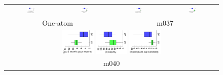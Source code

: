 \documentclass[usletter, 10pt, conference]{ieeeconf} %
\def\LA{L_1}
\def\LB{L_2}
\begin{document}
{\def\a{270}
\begin{figure}
\centering
\renewcommand{\tabcolsep}{0pt}
\begin{tabular}{cccc}
\includegraphics[width=0.15\textwidth,angle=\a]{fig/m001-oneAtom-cdCount} &
\includegraphics[width=0.15\textwidth,angle=\a]{fig/m001-oneAtom-rrt_path_time} &
\includegraphics[width=0.15\textwidth,angle=\a]{fig/m037t-cdCount} & 
\includegraphics[width=0.15\textwidth,angle=\a]{fig/m037t-rrt_path_time} \\
\multicolumn{2}{c}{One-atom} &
\multicolumn{2}{c}{m037}  \\
\multicolumn{4}{c}{%
\includegraphics[width=0.15\textwidth,angle=\a]{fig/m040-10-cdCount} 
\includegraphics[width=0.15\textwidth,angle=\a]{fig/m040-10-rrt_path_time} 
\includegraphics[width=0.15\textwidth,angle=\a]{fig/m040-10-trajDistToGoal}} \\
\multicolumn{4}{c}{m040} 
\end{tabular}
\end{figure}
}


%
\end{document}
